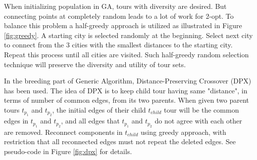 \documentclass[twocolumn]{article}
\begin{document}
When initializing population in GA, tours with diversity are desired. But connecting points at completely random leads to a lot of work for 2-opt. To balance this problem a half-greedy approach is utilized  as illustrated in Figure \ref{fig:greedy}. A starting city is selected randomly at the beginning. Select next city to connect from the 3 cities with the smallest distances to the starting city. Repeat this process until all cities are visited. Such half-greedy random selection technique will preserve the diversity and utility of tour sets.

In the breeding part of Generic Algorithm, Distance-Preserving Crossover (DPX) has been used. The idea of DPX is to keep child tour having same "distance", in terms of number of common edges, from its two parents. When given two parent tours $t_{p_1}$ and $t_{p_2}$, the initial edges of their child $t_{child}$ tour will be the common edges in $t_{p_1}$ and $t_{p_2}$, and all edges that $t_{p_1}$ and $t_{p_2}$ do not agree with each other are removed. Reconnect components in $t_{child}$ using greedy approach, with restriction that all reconnected edges must not repeat the deleted edges. See pseudo-code in Figure \ref{fig:dpx} for details.
\end{document}
